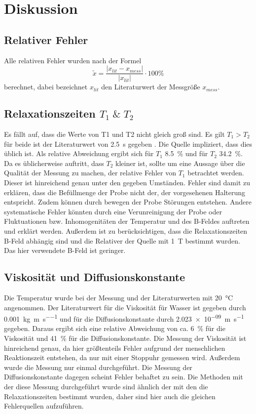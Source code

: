 \section{Diskussion}
\label{sec:Diskussion}
\subsection{Relativer Fehler}
Alle relativen Fehler wurden nach der Formel
\begin{equation*}
  \tilde{x} = \frac{ \lvert x_{lit} - x_{mess} \rvert}{\lvert x_{lit} \rvert}
  \cdot 100 \%
\end{equation*}
berechnet, dabei bezeichnet $x_{lit}$ den Literaturwert der Messgröße $x_{mess}$.
\subsection{Relaxationszeiten \texorpdfstring{$T_1 \; \& \; T_2$}{math}}
Es fällt auf, dass die Werte von T1 und T2 nicht gleich groß sind. Es gilt $T_1 > T_2$ für beide 
ist der Literaturwert von \SI{2,5}{\second} gegeben \cite{hyper}. 
Die Quelle impliziert, dass dies üblich ist. Als 
relative Abweichung ergibt sich für $T_1$ \SI{8,5}{\percent} und für $T_2$ \SI{34,2}{\percent}. Da es üblicherweise auftritt, 
dass $T_2$ kleiner ist, sollte um eine Aussage über die Qualität der Messung zu machen, der relative Fehler von $T_1$ 
betrachtet werden. Dieser ist hinreichend genau unter den gegeben Umständen. Fehler sind damit zu erklären, dass die 
Befüllmenge der Probe nicht der, der vorgesehenen Halterung entspricht. Zudem können durch bewegen der Probe Störungen 
entstehen. Andere systematische Fehler könnten durch eine Verunreinigung der Probe oder Fluktuationen bzw. 
Inhomogenitäten der Temperatur und des B-Feldes auftreten und erklärt werden. Außerdem ist zu berücksichtigen, 
dass die Relaxationszeiten B-Feld abhängig sind und die Relativer der Quelle mit \SI{1}{\tesla} bestimmt wurden. 
Das hier verwendete B-Feld ist geringer. 
\subsection{Viskosität und Diffusionskonstante}
Die Temperatur wurde bei der Messung und der Literaturwerten mit \SI{20}{\celsius} angenommen. 
Der Literaturwert für die Viskosität für Wasser ist gegeben durch \SI{0.001}{\kilo\gram\per\meter\per\second} 
\cite{spekvis} und für die Diffusionskonstante durch \SI{2.023e-09}{\meter\per\second} \cite{Diff} gegeben. 
Daraus ergibt sich eine relative Abweichung von ca. \SI{6}{\percent} für die Viskosität und 
\SI{41}{\percent} für die Diffusionskonstante. Die Messung der Viskosität ist hinreichend genau, da hier 
größtenteils Fehler aufgrund der menschlichen Reaktionszeit entstehen, da nur mit einer Stoppuhr gemessen wird. 
Außerdem wurde die Messung nur einmal durchgeführt. Die Messung der Diffusionskonstante dagegen scheint Fehler 
behaftet zu sein. Die Methoden mit der diese Messung durchgeführt wurde sind ähnlich der mit den die 
Relaxationszeiten bestimmt wurden, daher sind hier auch die gleichen Fehlerquellen aufzuführen.
